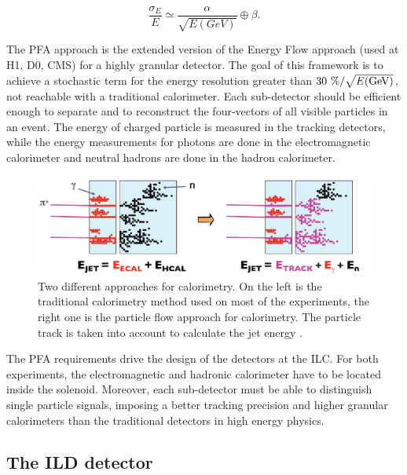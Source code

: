     \begin{equation}
      \frac{\sigma_E}{E} \simeq \frac{\alpha}{\sqrt{E(GeV)}} \oplus \beta.
      \label{eq:jet}
    \end{equation}

    The \gls{PFA} approach is the extended version of the Energy Flow approach (used at H1, D0, CMS) for a highly granular detector. 
    The goal of this framework is to achieve a stochastic term for the energy resolution greater than $30~\% / \sqrt{E\rm{(GeV)}}$, not reachable with a traditional calorimeter.
    Each sub-detector should be efficient enough to separate and to reconstruct the four-vectors of all visible particles in an event.
    The energy of charged particle is measured in the tracking detectors, while the energy measurements for photons are done in the electromagnetic calorimeter and neutral hadrons are done in the hadron calorimeter.
     
     \begin{figure}[!h]
      \centering
      \includegraphics[width = 15cm]{Pictures/ILC/physics.jpg}
      \caption{Two different approaches for calorimetry. On the left is the traditional calorimetry method used on most of the experiments, the right one is the particle flow approach for calorimetry. The particle track is taken into account to calculate the jet energy \cite{PFA}.}
      \label{fig:jetEnergy}
    \end{figure}   
    
    The \gls{PFA} requirements drive the design of the detectors at the ILC.
    For both experiments, the electromagnetic and hadronic calorimeter have to be located inside the solenoid.
    Moreover, each sub-detector must be able to distinguish single particle signals, imposing a better tracking precision and higher granular calorimeters than the traditional detectors in high energy physics.

    \subsection{The ILD detector}
    
